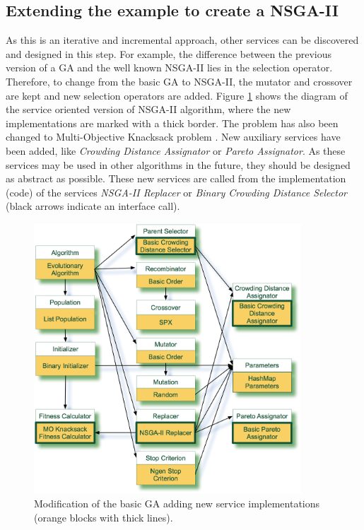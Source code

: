 \subsection{Extending the example to create a NSGA-II}
\label{subsec:osgiliath:nsga2}

As this is an iterative and incremental approach, other services can be discovered and designed in this step. For example, the difference between the previous version of a GA and the well known NSGA-II lies in the selection operator. Therefore, to change from the basic GA to NSGA-II, the mutator and crossover are kept and new selection operators are added. Figure \ref{fig:nsga2} shows the diagram of the service oriented version of NSGA-II algorithm, where the new implementations are marked with a thick border. The problem has also been changed to Multi-Objective Knacksack problem \cite{zitzler1999multiobjective}. New auxiliary services have been added, like {\em Crowding Distance Assignator} or {\em Pareto Assignator}. As these services may be used in other algorithms in the future, they should be designed as abstract as possible. These new services are called from the implementation (code) of the services {\em NSGA-II Replacer} or {\em Binary Crowding Distance Selector} (black arrows indicate an interface call). 




\begin{figure}
\centering
\includegraphics[width=10cm]{gfx/soaea/nsga2.jpg}
\caption{Modification of the basic GA adding new service implementations (orange blocks with thick lines).}
\label{fig:nsga2}
\end{figure}



